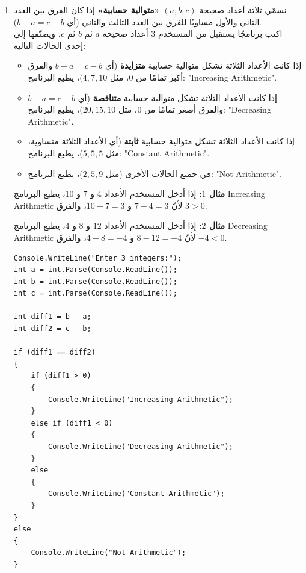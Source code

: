 \documentclass[14pt]{extarticle}
\begin{document}
\begin{enumerate}[resume, itemsep=2.2em]
\item
نسمّي ثلاثة أعداد صحيحة $(a, b, c)$ \textbf{«متوالية حسابية»} إذا كان الفرق بين العدد الثاني والأول مساويًا للفرق بين العدد الثالث والثاني (أي $b - a = c - b$). \\
اكتب برنامجًا يستقبل من المستخدم $3$ أعداد صحيحة $a$ ثم $b$ ثم $c$، ويصنّفها إلى إحدى الحالات التالية:
\begin{itemize}[nosep]
    \item إذا كانت الأعداد الثلاثة تشكل متوالية حسابية \textbf{متزايدة} (أي $b - a = c - b$ والفرق أكبر تمامًا من $0$، مثل $4, 7, 10$)، يطبع البرنامج: \textenglish{"Increasing Arithmetic"}.
    \item إذا كانت الأعداد الثلاثة تشكل متوالية حسابية \textbf{متناقصة} (أي $b - a = c - b$ والفرق أصغر تمامًا من $0$، مثل $20, 15, 10$)، يطبع البرنامج: \textenglish{"Decreasing Arithmetic"}.
    \item إذا كانت الأعداد الثلاثة تشكل متوالية حسابية \textbf{ثابتة} (أي الأعداد الثلاثة متساوية، مثل $5, 5, 5$)، يطبع البرنامج: \textenglish{"Constant Arithmetic"}.
    \item في جميع الحالات الأخرى (مثل $2, 5, 9$)، يطبع البرنامج: \textenglish{"Not Arithmetic"}.
\end{itemize}

\textbf{مثال $1$:} إذا أدخل المستخدم الأعداد $4$ و $7$ و $10$، يطبع البرنامج \textenglish{Increasing Arithmetic} لأنّ $7 - 4 = 3$ و $10 - 7 = 3$، والفرق $3 > 0$.

\textbf{مثال $2$:} إذا أدخل المستخدم الأعداد $12$ و $8$ و $4$، يطبع البرنامج \textenglish{Decreasing Arithmetic} لأنّ $8 - 12 = -4$ و $4 - 8 = -4$، والفرق $-4 < 0$.

\ifwithsols
\begin{boxSolution}
\begin{english}
\begin{verbatim}
Console.WriteLine("Enter 3 integers:");
int a = int.Parse(Console.ReadLine());
int b = int.Parse(Console.ReadLine());
int c = int.Parse(Console.ReadLine());

int diff1 = b - a;
int diff2 = c - b;

if (diff1 == diff2)
{
    if (diff1 > 0)
    {
        Console.WriteLine("Increasing Arithmetic");
    }
    else if (diff1 < 0)
    {
        Console.WriteLine("Decreasing Arithmetic");
    }
    else
    {
        Console.WriteLine("Constant Arithmetic");
    }
}
else
{
    Console.WriteLine("Not Arithmetic");
}
\end{verbatim}
\end{english}
\end{boxSolution}
\fi
\filbreak


\end{enumerate}
\end{document}
